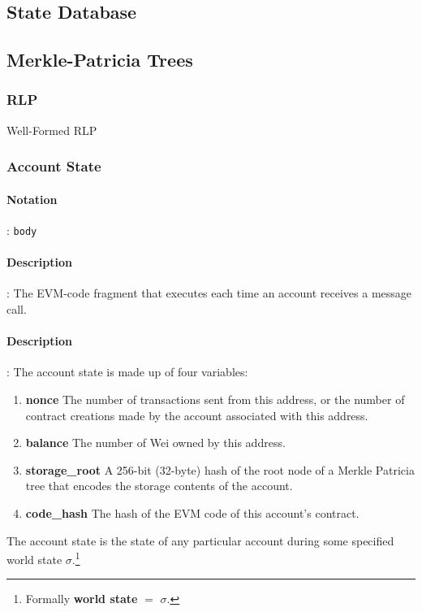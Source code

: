 \documentclass[10pt,a4paper,leqno,bibliography=totoc]{scrartcl}
\newenvironment{alphafootnotes}
{\par\edef\savedfootnotenumber{\number\value{footnote}}
\renewcommand{\thefootnote}{\alph{footnote}}
\setcounter{footnote}{0}}
{\par\setcounter{footnote}{\savedfootnotenumber}}
\begin{document}
\begin{alphafootnotes}
\begin{multicols*}{2}
		\subsection{State Database}

		\subsection{Merkle-Patricia Trees}

			\subsubsection{RLP}
				Well-Formed RLP
	
			\subsubsection{Account State}
				\paragraph{Notation}: \texttt{body}
				\paragraph{Description}: The EVM-code fragment that executes each time an account receives a message call. 

				\paragraph{Description}: The account state is made up of four variables:
				\begin{enumerate}
					\item \textbf{nonce} The number of transactions sent from this address, or the number of contract creations made by the account associated with this address.
					\item \textbf{balance} The number of Wei owned by this address.
					\item \textbf{storage\_root} A 256-bit (32-byte) hash of the root node of a Merkle Patricia tree that encodes the storage contents of the account.
					\item \textbf{code\_hash} The hash of the EVM code of this account's contract.
				\end{enumerate}

				The account state is the state of any particular account during some specified world state $\sigma$.\footnote{Formally \textbf{world state} $=$ $\sigma$.} \par


\end{multicols*}
\end{alphafootnotes}
\end{document}
